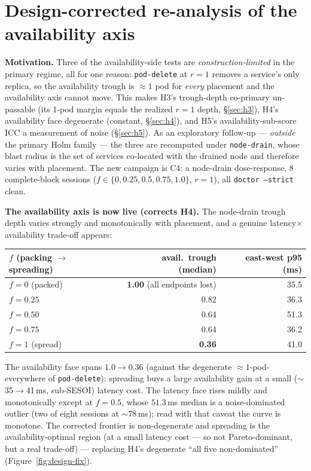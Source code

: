 \section{Design-corrected re-analysis of the availability axis}\label{sec:design-fix}

\textbf{Motivation.} Three of the availability-side tests are
\emph{construction-limited} in the primary regime, all for one reason:
\texttt{pod-delete} at $r{=}1$ removes a service's only replica, so the
availability trough is $\approx 1$ pod for \emph{every} placement and the
availability axis cannot move. This makes H3's trough-depth co-primary
un-passable (its 1-pod margin equals the realized $r{=}1$ depth, \S\ref{sec:h3}),
H4's availability face degenerate (constant, \S\ref{sec:h4}), and H5's
availability-sub-score ICC a measurement of noise (\S\ref{sec:h5}). As an
exploratory follow-up --- \emph{outside} the primary Holm family ---
the three are recomputed under \texttt{node-drain}, whose blast radius is the set
of services co-located with the drained node and therefore varies with placement.
The new campaign is C4: a
node-drain dose-response, 8 complete-block sessions ($f \in \{0,0.25,0.5,0.75,
1.0\}$, $r{=}1$), all \texttt{doctor --strict} clean.

\textbf{The availability axis is now live (corrects H4).} The node-drain trough
depth varies strongly and monotonically with placement, and a genuine
latency$\times$availability trade-off appears:

\begin{center}
\begin{tabular}{lrr}
\toprule
$f$ (packing $\rightarrow$ spreading) & avail.\ trough (median) & east-west p95 (ms) \\
\midrule
$f{=}0$ (packed) & \textbf{1.00} (all endpoints lost) & 35.5 \\
$f{=}0.25$ & 0.82 & 36.3 \\
$f{=}0.50$ & 0.64 & 51.3 \\
$f{=}0.75$ & 0.64 & 36.2 \\
$f{=}1$ (spread) & \textbf{0.36} & 41.0 \\
\bottomrule
\end{tabular}
\end{center}

The availability face spans $1.0 \rightarrow 0.36$ (against the degenerate
$\approx 1$-pod-everywhere of \texttt{pod-delete}): spreading buys a large
availability gain at a small ($\sim$35$\rightarrow$41\,ms, sub-SESOI) latency
cost. The latency face rises mildly and monotonically except at $f{=}0.5$, whose
$51.3$\,ms median is a noise-dominated outlier (two of eight sessions at
$\sim$78\,ms); read with that caveat the curve is monotone. The corrected
frontier is non-degenerate and spreading is the availability-optimal region (at a
small latency cost --- so not Pareto-dominant, but a real trade-off) --- replacing
H4's degenerate ``all five non-dominated'' (Figure~\ref{fig:design-fix}).

